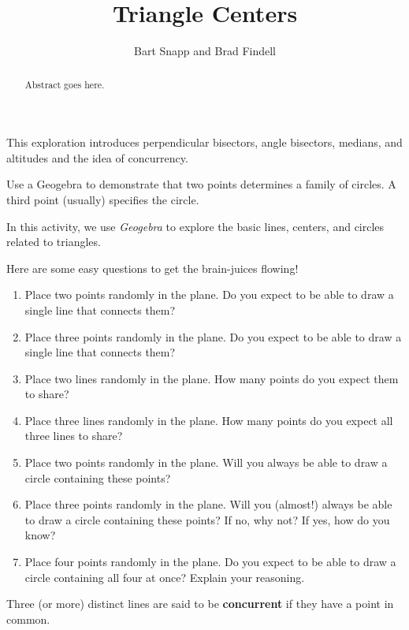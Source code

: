 \documentclass{ximera}
\title{Triangle Centers}
\author{Bart Snapp and Brad Findell}
\begin{document}
\begin{abstract}
Abstract goes here.  
\end{abstract}
\maketitle

\begin{teachingnote}
This exploration introduces perpendicular bisectors, angle bisectors, medians, and altitudes and the idea of concurrency.  

Use a Geogebra to demonstrate that two points determines a family of circles.  A third point (usually) specifies the circle.
\end{teachingnote}

In this activity, we use \textsl{Geogebra} to explore the basic lines, centers, and circles related to triangles.  

\begin{problem} Here are some easy questions to get the brain-juices flowing!
\begin{enumerate} 
\itemsep -3pt
\item Place two points randomly in the plane. Do you expect to be able to
draw a single line that connects them?
\item Place three points randomly in the plane. Do you expect to be able to
draw a single line that connects them?
\item Place two lines randomly in the plane. How many points do you expect
them to share?
\item Place three lines randomly in the plane. How many points do you expect
all three lines to share?
\item Place two points randomly in the plane. Will you always be
able to draw a circle containing these points?
\item Place three points randomly in the plane. Will you (almost!) always be
able to draw a circle containing these points? If no, why not? If yes,
how do you know?
\item Place four points randomly in the plane. Do you expect to be able to
draw a circle containing all four at once? Explain your reasoning.
\end{enumerate}
\end{problem}

\begin{definition}
Three (or more) distinct lines are said to be \textbf{concurrent} if they have a point in common.  
\end{definition}
\end{document}

